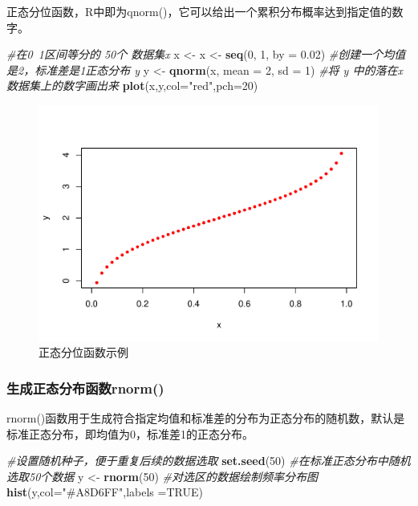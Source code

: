 \documentclass[
]{article}
\newenvironment{Shaded}{\begin{snugshade}}{\end{snugshade}}
\newcommand{\CommentTok}[1]{\textcolor[rgb]{0.56,0.35,0.01}{\textit{#1}}}
\newcommand{\DataTypeTok}[1]{\textcolor[rgb]{0.13,0.29,0.53}{#1}}
\newcommand{\DecValTok}[1]{\textcolor[rgb]{0.00,0.00,0.81}{#1}}
\newcommand{\FloatTok}[1]{\textcolor[rgb]{0.00,0.00,0.81}{#1}}
\newcommand{\KeywordTok}[1]{\textcolor[rgb]{0.13,0.29,0.53}{\textbf{#1}}}
\newcommand{\NormalTok}[1]{#1}
\newcommand{\OtherTok}[1]{\textcolor[rgb]{0.56,0.35,0.01}{#1}}
\newcommand{\StringTok}[1]{\textcolor[rgb]{0.31,0.60,0.02}{#1}}
\begin{document}
正态分位函数，R中即为qnorm()，它可以给出一个累积分布概率达到指定值的数字。

\begin{Shaded}
\begin{Highlighting}[]
\CommentTok{#在0~1区间等分的 50个 数据集x}
\NormalTok{x <-}\StringTok{ }\NormalTok{x <-}\StringTok{ }\KeywordTok{seq}\NormalTok{(}\DecValTok{0}\NormalTok{, }\DecValTok{1}\NormalTok{, }\DataTypeTok{by =} \FloatTok{0.02}\NormalTok{)}
\CommentTok{#创建一个均值是2，标准差是1正态分布 y}
\NormalTok{y <-}\StringTok{ }\KeywordTok{qnorm}\NormalTok{(x, }\DataTypeTok{mean =} \DecValTok{2}\NormalTok{, }\DataTypeTok{sd =} \DecValTok{1}\NormalTok{)}
\CommentTok{#将 y 中的落在x数据集上的数字画出来}
\KeywordTok{plot}\NormalTok{(x,y,}\DataTypeTok{col=}\StringTok{"red"}\NormalTok{,}\DataTypeTok{pch=}\DecValTok{20}\NormalTok{)}
\end{Highlighting}
\end{Shaded}

\begin{figure}

{\centering \includegraphics[width=0.49\linewidth,height=0.49\textheight]{figs/qnorm} 

}

\caption{正态分位函数示例}\label{fig:qnorm}
\end{figure}

\hypertarget{ux751fux6210ux6b63ux6001ux5206ux5e03ux51fdux6570rnorm}{%
\subsubsection{生成正态分布函数rnorm()}\label{ux751fux6210ux6b63ux6001ux5206ux5e03ux51fdux6570rnorm}}

rnorm()函数用于生成符合指定均值和标准差的分布为正态分布的随机数，默认是标准正态分布，即均值为0，标准差1的正态分布。

\begin{Shaded}
\begin{Highlighting}[]
\CommentTok{#设置随机种子，便于重复后续的数据选取}
\KeywordTok{set.seed}\NormalTok{(}\DecValTok{50}\NormalTok{)}
\CommentTok{#在标准正态分布中随机选取50个数据}
\NormalTok{y <-}\StringTok{ }\KeywordTok{rnorm}\NormalTok{(}\DecValTok{50}\NormalTok{)}
\CommentTok{#对选区的数据绘制频率分布图}
\KeywordTok{hist}\NormalTok{(y,}\DataTypeTok{col=}\StringTok{"#A8D6FF"}\NormalTok{,}\DataTypeTok{labels =}\OtherTok{TRUE}\NormalTok{)}
\end{Highlighting}
\end{Shaded}
\end{document}
